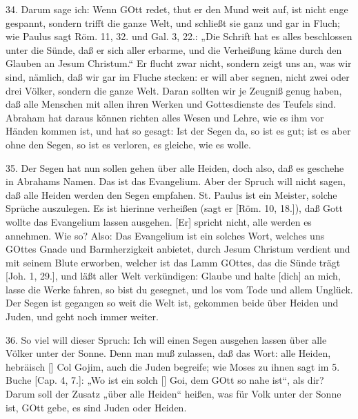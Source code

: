 34. Darum sage ich: Wenn GOtt redet, thut er den Mund weit auf, ist nicht enge gespannt, sondern trifft die ganze Welt, und schließt sie ganz und gar in Fluch; wie Paulus sagt Röm. 11, 32. und Gal. 3, 22.: „Die Schrift hat es alles beschlossen unter die Sünde, daß er sich aller erbarme, und die Verheißung käme durch den Glauben an Jesum Christum.“ Er flucht zwar nicht, sondern zeigt uns an, was wir sind, nämlich, daß wir gar im Fluche stecken: er will aber segnen, nicht zwei oder drei Völker, sondern die ganze Welt. Daran sollten wir je Zeugniß genug haben, daß alle Menschen mit allen ihren Werken und Gottesdienste des Teufels sind. Abraham hat daraus können richten alles Wesen und Lehre, wie es ihm vor Händen kommen ist, und hat so gesagt: Ist der Segen da, so ist es gut; ist es aber ohne den Segen, so ist es verloren, es gleiche, wie es wolle.

35. Der Segen hat nun sollen gehen über alle Heiden, doch also, daß es geschehe in Abrahams Namen. Das ist das Evangelium. Aber der Spruch will nicht sagen, daß alle Heiden werden den Segen empfahen. St. Paulus ist ein Meister, solche Sprüche auszulegen. Es ist hierinne verheißen (sagt er [Röm. 10, 18.]), daß Gott wollte das Evangelium lassen ausgehen. [Er] spricht nicht, alle werden es annehmen. Wie so? Also: Das Evangelium ist ein solches Wort, welches uns GOttes Gnade und Barmherzigkeit anbietet, durch Jesum Christum verdient und mit seinem Blute erworben, welcher ist das Lamm GOttes, das die Sünde trägt [Joh. 1, 29.], und läßt aller Welt verkündigen: Glaube und halte [dich] an mich, lasse die Werke fahren, so bist du gesegnet, und los vom Tode und allem Unglück. Der Segen ist gegangen so weit die Welt ist, gekommen beide über Heiden und Juden, und geht noch immer weiter.

36. So viel will dieser Spruch: Ich will einen Segen ausgehen lassen über alle Völker unter der Sonne. Denn man muß zulassen, daß das Wort: alle Heiden, hebräisch [] Col Gojim, auch die Juden begreife; wie Moses zu ihnen sagt im 5. Buche [Cap. 4, 7.]: „Wo ist ein solch [] Goi, dem GOtt so nahe ist“, als dir? Darum soll der Zusatz „über alle Heiden“ heißen, was für Volk unter der Sonne ist, GOtt gebe, es sind Juden oder Heiden.

